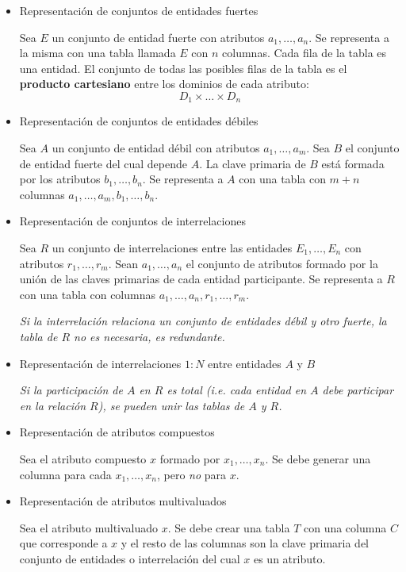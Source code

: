 \documentclass[a4paper, twoside]{article}
\begin{document}
\begin{itemize}
	\item Representación de conjuntos de entidades fuertes

	Sea $E$ un conjunto de entidad fuerte con atributos $a_{1},\ldots,a_{n}$. Se representa a la misma con una tabla llamada $E$ con $n$ columnas. Cada fila de la tabla es una entidad. El conjunto de todas las posibles filas de la tabla es el \textbf{producto cartesiano }entre los dominios de cada atributo:
	\[
		D_{1}\times\ldots\times D_{n}
	\]

	\item Representación de conjuntos de entidades débiles

	Sea $A$ un conjunto de entidad débil con atributos $a_{1},\ldots,a_{m}$. Sea $B$ el conjunto de entidad fuerte del cual depende $A$. La clave primaria de $B$ está formada por los atributos $b_{1},\ldots,b_{n}$. Se representa a $A$ con una tabla con $m+n$ columnas $a_{1},\ldots,a_{m},b_{1},\ldots,b_{n}$.

	\item Representación de conjuntos de interrelaciones

	Sea $R$ un conjunto de interrelaciones entre las entidades $E_{1},\dots,E_{n}$ con atributos $r_{1},\ldots,r_{m}$. Sean $a_{1},\ldots,a_{n}$ el conjunto de atributos formado por la unión de las claves primarias de cada entidad participante. Se representa a $R$ con una tabla con columnas $a_{1},\ldots,a_{n},r_{1},\ldots,r_{m}$.
	
	\emph{Si la interrelación relaciona un conjunto de entidades débil y otro fuerte, la tabla de $R$ no es necesaria, es redundante.}

	\item Representación de interrelaciones $1:N$ entre entidades $A$ y $B$

	\emph{Si la participación de $A$ en $R$ es total (i.e. cada entidad en $A$ debe participar en la relación $R$), se pueden unir las tablas de $A$ y $R$.}

	\item Representación de atributos compuestos

	Sea el atributo compuesto $x$ formado por $x_{1},\ldots,x_{n}$. Se debe generar una columna para cada $x_{1},\ldots,x_{n}$, pero \emph{no} para $x$.

	\item Representación de atributos multivaluados

	Sea el atributo multivaluado $x$. Se debe crear una tabla $T$ con una columna $C$ que corresponde a $x$ y el resto de las columnas son la clave primaria del conjunto de entidades o interrelación del cual $x$ es un atributo.


\end{itemize}
\end{document}
